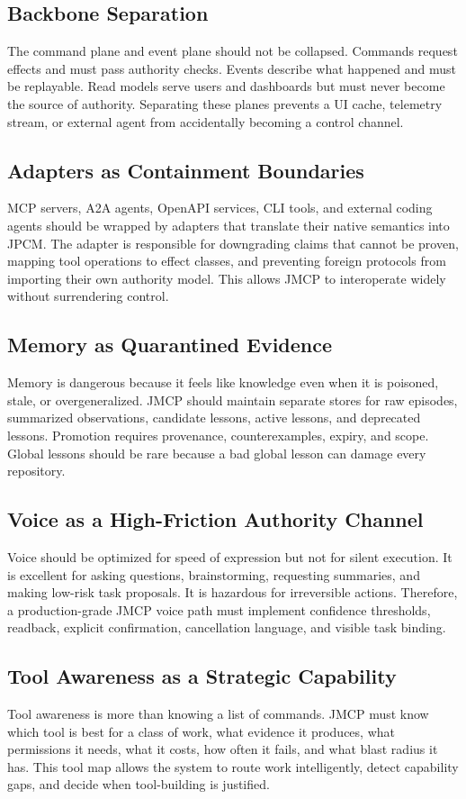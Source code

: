 \documentclass[10pt,journal,onecolumn]{IEEEtran}
\begin{document}
\subsection{Backbone Separation}
The command plane and event plane should not be collapsed. Commands request effects and must pass authority checks. Events describe what happened and must be replayable. Read models serve users and dashboards but must never become the source of authority. Separating these planes prevents a UI cache, telemetry stream, or external agent from accidentally becoming a control channel.

\subsection{Adapters as Containment Boundaries}
MCP servers, A2A agents, OpenAPI services, CLI tools, and external coding agents should be wrapped by adapters that translate their native semantics into JPCM. The adapter is responsible for downgrading claims that cannot be proven, mapping tool operations to effect classes, and preventing foreign protocols from importing their own authority model. This allows JMCP to interoperate widely without surrendering control.

\subsection{Memory as Quarantined Evidence}
Memory is dangerous because it feels like knowledge even when it is poisoned, stale, or overgeneralized. JMCP should maintain separate stores for raw episodes, summarized observations, candidate lessons, active lessons, and deprecated lessons. Promotion requires provenance, counterexamples, expiry, and scope. Global lessons should be rare because a bad global lesson can damage every repository.

\subsection{Voice as a High-Friction Authority Channel}
Voice should be optimized for speed of expression but not for silent execution. It is excellent for asking questions, brainstorming, requesting summaries, and making low-risk task proposals. It is hazardous for irreversible actions. Therefore, a production-grade JMCP voice path must implement confidence thresholds, readback, explicit confirmation, cancellation language, and visible task binding.

\subsection{Tool Awareness as a Strategic Capability}
Tool awareness is more than knowing a list of commands. JMCP must know which tool is best for a class of work, what evidence it produces, what permissions it needs, what it costs, how often it fails, and what blast radius it has. This tool map allows the system to route work intelligently, detect capability gaps, and decide when tool-building is justified.
\end{document}
